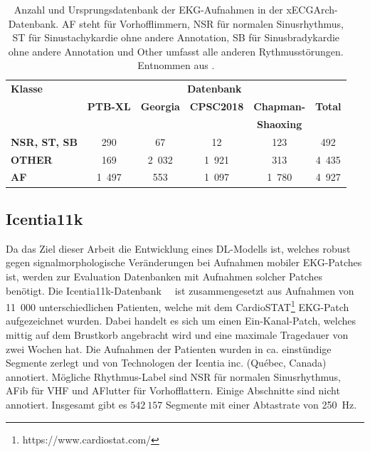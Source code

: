 \begin{table}[h!]
\centering
\caption[Klassenverteilung der xECGArch-Datenbank]{Anzahl und Ursprungsdatenbank der \gls{EKG}-Aufnahmen in der xECGArch-Datenbank. AF steht für Vorhofflimmern, NSR für normalen Sinusrhythmus, ST für Sinustachykardie ohne andere Annotation, SB für Sinusbradykardie ohne andere Annotation und Other umfasst alle anderen Rythmusstörungen. Entnommen aus \cite{goettling_xecgarch_2024}. }
\label{tab:Klassenverteilung_xECG}
\begin{tabular}{lccccc}
\toprule
\textbf{Klasse}       & \multicolumn{5}{c}{\textbf{Datenbank}} \\ 
\cmidrule(lr){2-6}
                     & \textbf{PTB-XL} & \textbf{Georgia} & \textbf{CPSC2018} & \textbf{Chapman-} & \textbf{Total} \\
                     &                 &                  &                   & \textbf{Shaoxing} &                \\ 
\midrule
\textbf{NSR, ST, SB} & 290             & 67               & 12                & 123               & 492            \\
\textbf{OTHER}       & 169             & 2~032            & 1~921             & 313               & 4~435          \\
\textbf{AF}          & 1~497           & 553              & 1~097             & 1~780             & 4~927          \\
\bottomrule
\end{tabular}
\end{table}


\subsection*{Icentia11k}
Da das Ziel dieser Arbeit die Entwicklung eines \gls{DL}-Modells ist, welches robust gegen signalmorphologische Veränderungen bei Aufnahmen mobiler \gls{EKG}-Patches ist, werden zur Evaluation Datenbanken mit Aufnahmen solcher Patches benötigt.
Die Icentia11k-Datenbank~\cite{tan_icentia11k_2021}~\cite{tan_icentia11k_2022} ist zusammengesetzt aus Aufnahmen von 11~000 unterschiedlichen Patienten, welche mit dem CardioSTAT\footnote{https://www.cardiostat.com/} \gls{EKG}-Patch \cite{paquet_adhesive_2022} aufgezeichnet wurden. Dabei handelt es sich um einen Ein-Kanal-Patch, welches mittig auf dem Brustkorb angebracht wird und eine maximale Tragedauer von zwei Wochen hat. Die Aufnahmen der Patienten wurden in ca. einstündige Segmente zerlegt und von Technologen der Icentia inc. (Qu\'ebec, Canada) annotiert. Mögliche Rhythmus-Label sind NSR für normalen Sinusrhythmus, AFib für \gls{VHF} und AFlutter für Vorhofflattern. Einige Abschnitte sind nicht annotiert. Insgesamt gibt es $542~157$ Segmente mit einer Abtastrate von 250~Hz. \cite{tan_icentia11k_2021}


